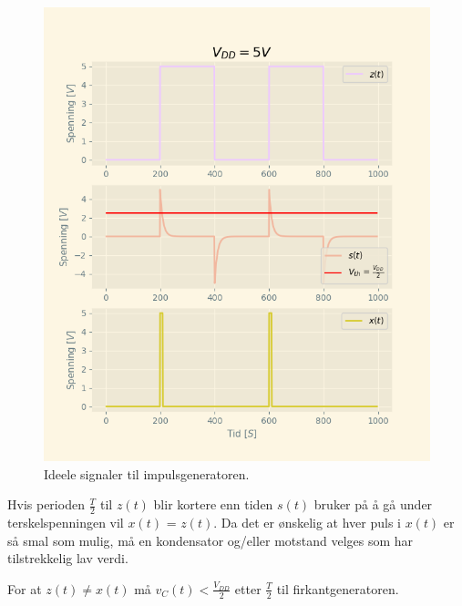 \documentclass[a4paper,11pt,norsk]{article}
\begin{document}
\begin{figure}[H]
    \centering
    \includegraphics[scale=0.75]{D1/Images/zsx.png}
    \caption{Ideele signaler til impulsgeneratoren.}
    \label{fig:zsx}
\end{figure}

Hvis perioden $\frac{T}{2}$ til $z(t)$ blir kortere enn tiden $s(t)$ bruker på å gå under terskelspenningen vil $x(t)$ = $z(t)$. Da det er ønskelig at hver puls i $x(t)$ er så smal som mulig, må en kondensator og/eller motstand velges som har tilstrekkelig lav verdi.

For at $z(t) \neq x(t)$ må $v_C(t) < \frac{V_{DD}}{2}$ etter $\frac{T}{2}$ til firkantgeneratoren. 
\end{document}
